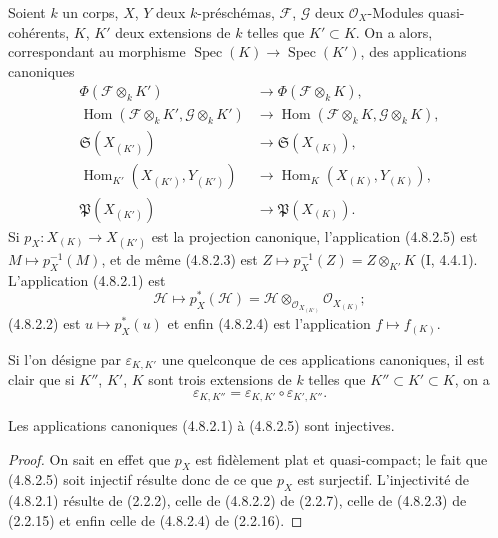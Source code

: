 \begin{env}[4.8.2]
\label{IV.2.4.8.2-fr}
Soient $k$ un corps, $X$, $Y$ deux $k$-préschémas, $\mathscr F$, $\mathscr G$
deux $\mathcal O_X$-Modules quasi-cohérents, $K$, $K'$ deux extensions de $k$
telles que $K'\subset K$. On a alors, correspondant au morphisme
$\operatorname{Spec}(K)\to\operatorname{Spec}(K')$, des applications
canoniques
\begin{align}
\Phi(\mathscr F\otimes_kK')
&\longrightarrow\Phi(\mathscr F\otimes_kK),
\tag{4.8.2.1}
\label{IV.2.4.8.2.1-fr}\\
\operatorname{Hom}(\mathscr F\otimes_kK',\mathscr G\otimes_kK')
&\longrightarrow
\operatorname{Hom}(\mathscr F\otimes_kK,\mathscr G\otimes_kK),
\tag{4.8.2.2}
\label{IV.2.4.8.2.2-fr}\\
\mathfrak S(X_{(K')})&\longrightarrow\mathfrak S(X_{(K)}),
\tag{4.8.2.3}
\label{IV.2.4.8.2.3-fr}\\
\operatorname{Hom}_{K'}(X_{(K')},Y_{(K')})
&\longrightarrow\operatorname{Hom}_K(X_{(K)},Y_{(K)}),
\tag{4.8.2.4}
\label{IV.2.4.8.2.4-fr}\\
\mathfrak P(X_{(K')})&\longrightarrow\mathfrak P(X_{(K)}).
\tag{4.8.2.5}
\label{IV.2.4.8.2.5-fr}
\end{align}
Si $p_X:X_{(K)}\to X_{(K')}$ est la projection canonique, l'application
(4.8.2.5) est $M\mapsto p_X^{-1}(M)$, et de même (4.8.2.3) est
$Z\mapsto p_X^{-1}(Z)=Z\otimes_{K'}K$ (I, 4.4.1). L'application (4.8.2.1)
est
\[
\mathscr H\longmapsto p_X^*(\mathscr H)
=\mathscr H\otimes_{\mathcal O_{X_{(K')}}}\mathcal O_{X_{(K)}};
\]
(4.8.2.2) est $u\mapsto p_X^*(u)$ et enfin (4.8.2.4) est l'application
$f\mapsto f_{(K)}$.

Si l'on désigne par $\varepsilon_{K,K'}$ une quelconque de ces applications
canoniques, il est clair que si $K''$, $K'$, $K$ sont trois extensions de $k$
telles que $K''\subset K'\subset K$, on a
\begin{equation}
\varepsilon_{K,K''}=\varepsilon_{K,K'}\circ\varepsilon_{K',K''}.
\tag{4.8.2.6}
\label{IV.2.4.8.2.6-fr}
\end{equation}
\end{env}


\begin{proposition}[4.8.3]
\label{IV.2.4.8.3-fr}
Les applications canoniques (4.8.2.1) à (4.8.2.5) sont injectives.
\end{proposition}

\begin{proof}
On sait en effet que $p_X$ est fidèlement plat et quasi-compact; le fait que
(4.8.2.5) soit injectif résulte donc de ce que $p_X$ est surjectif.
L'injectivité de (4.8.2.1) résulte de (2.2.2), celle de (4.8.2.2) de (2.2.7),
celle de (4.8.2.3) de (2.2.15) et enfin celle de (4.8.2.4) de (2.2.16).
\end{proof}

